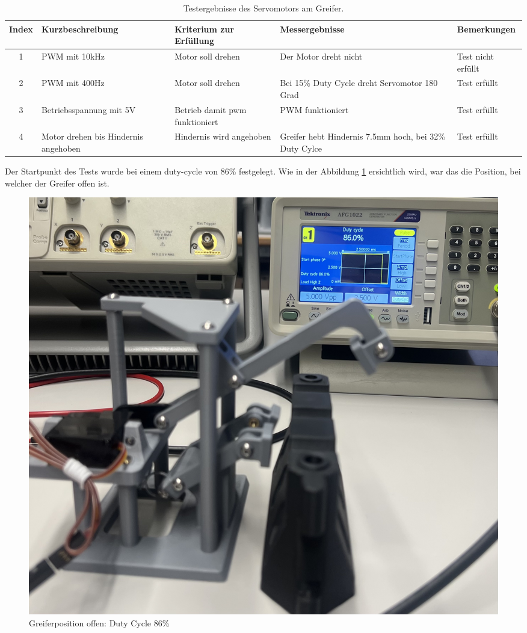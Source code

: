 \begin{table}[H]
\centering
\small
\begin{tabularx}{\textwidth}{|c|X|X|X|l|}
        \hline
        \textbf{Index} & \textbf{Kurzbeschreibung} & \textbf{Kriterium zur Erfüllung} & \textbf{Messergebnisse} & \textbf{Bemerkungen} \\
        \hline
        1 & PWM mit 10kHz & Motor soll drehen & Der Motor dreht nicht & Test nicht erfüllt \\ \hline
        2 & PWM mit 400Hz & Motor soll drehen & Bei 15\% Duty Cycle dreht Servomotor 180 Grad & Test erfüllt \\ \hline
        3 & Betriebsspannung mit 5V & Betrieb damit \acrshort{pwm} funktioniert  & PWM funktioniert & Test erfüllt\\ \hline
        4 & Motor drehen bis Hindernis angehoben & Hindernis wird angehoben & Greifer hebt Hindernis 7.5mm hoch, bei 32\% Duty Cylce & Test erfüllt \\ \hline
\end{tabularx}
    \caption{Testergebnisse des Servomotors am Greifer.}
\label{tab:testpunkte Servomotor}
\end{table}


Der Startpunkt des Tests wurde bei einem \gls{duty-cycle} von 86\% festgelegt. Wie in der Abbildung \ref{fig: Greiferposition offen: Duty Cycle 86} ersichtlich wird, war das die Position, bei welcher der Greifer offen ist.

\begin{figure}[H]
    \centering
    \includegraphics[width=0.8\linewidth]{img/ServoGreifferoffen.jpeg}
    \caption{Greiferposition offen: Duty Cycle 86\%}
    \label{fig: Greiferposition offen: Duty Cycle 86}
\end{figure}

